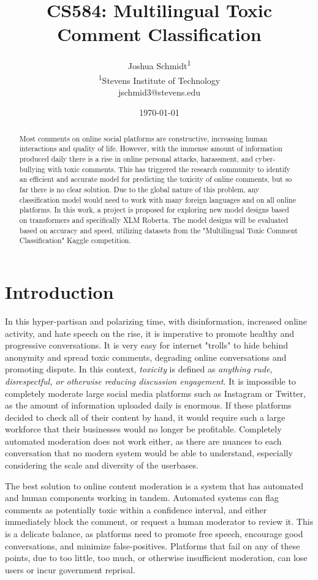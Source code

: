\documentclass{article}
\title{CS584: Multilingual Toxic Comment Classification} %
\author{
Joshua Schmidt\textsuperscript{1}\\
\textsuperscript{1}{Stevens Institute of Technology}\\
jschmid3@stevens.edu
}
\date{\today}
\begin{document}
\maketitle
\begin{abstract}

Most comments on online social platforms are constructive, increasing human interactions and quality of life. However, with the immense amount of information produced daily there is a rise in online personal attacks, harassment, and cyber-bullying with toxic comments. This has triggered the research community to identify an efficient and accurate model for predicting the toxicity of online comments, but so far there is no clear solution. Due to the global nature of this problem, any classification model would need to work with many foreign languages and on all online platforms. In this work, a project is proposed for exploring new model designs based on transformers and specifically XLM Roberta. The model designs will be evaluated based on accuracy and speed, utilizing datasets from the "Multilingual Toxic Comment Classification" Kaggle competition.

\end{abstract}

\section{Introduction}

In this hyper-partisan and polarizing time, with disinformation, increased online activity, and hate speech on the rise, it is imperative to promote healthy and progressive conversations. It is very easy for internet "trolls" to hide behind anonymity and spread toxic comments, degrading online conversations and promoting dispute. In this context, \textit{toxicity} is defined as \textit{anything rude, disrespectful, or otherwise reducing discussion engagement}. It is impossible to completely moderate large social media platforms such as Instagram or Twitter, as the amount of information uploaded daily is enormous. If these platforms decided to check all of their content by hand, it would require such a large workforce that their businesses would no longer be profitable. Completely automated moderation does not work either, as there are nuances to each conversation that no modern system would be able to understand, especially considering the scale and diversity of the userbases.

The best solution to online content moderation is a system that has automated and human components working in tandem. Automated systems can flag comments as potentially toxic within a confidence interval, and either immediately block the comment, or request a human moderator to review it. This is a delicate balance, as platforms need to promote free speech, encourage good conversations, and minimize false-positives. Platforms that fail on any of these points, due to too little, too much, or otherwise insufficient moderation, can lose users or incur government reprisal.
\end{document}
